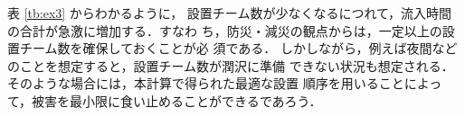 \documentclass[a4paper,10pt]{jarticle}
\begin{document}
\vspace{-5mm}
%
\begin{table}[htpb]
 \begin{center}
  \caption{チーム数・設置開始時刻と流入時間の合計の関係}
  \label{tb:ex3}
 \end{center}
\end{table}

\vspace{-3mm}
表 \ref{tb:ex3} からわかるように，
設置チーム数が少なくなるにつれて，流入時間の合計が急激に増加する．すなわ
ち，防災・減災の観点からは，一定以上の設置チーム数を確保しておくことが必
須である．
%
しかしながら，例えば夜間などのことを想定すると，設置チーム数が潤沢に準備
できない状況も想定される．そのような場合には，本計算で得られた最適な設置
順序を用いることによって，被害を最小限に食い止めることができるであろう．
\end{document}
